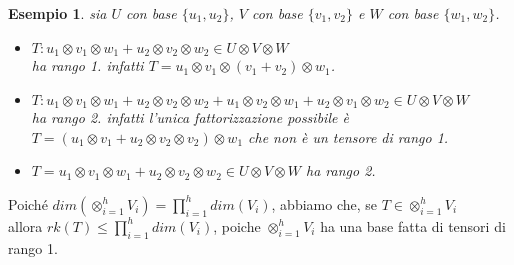 \documentclass[a4paper,12pt]{article}
\theoremstyle{def}
\theoremstyle{prop}
\theoremstyle{esempio}
\newtheorem*{example}{Esempio}
\theoremstyle{dimostrazione}
\theoremstyle{teo}
\theoremstyle{osservazione}
\begin{document}
\begin{example}
	sia \(U\) con base \(\{u_1, u_2\}\), \(V\) con base \(\{v_1, v_2\}\) e \(W\) con base \(\{w_1, w_2\}\).
	\begin{itemize}
		\item \(T: u_1 \otimes v_1 \otimes w_1 + u_2 \otimes v_2 \otimes w_2  \in U \otimes V  \otimes W\)\\
		      ha rango 1. infatti \(T = u_1 \otimes v_1 \otimes (v_1 + v_2 )\otimes w_1\).
		\item \(T: u_1 \otimes v_1 \otimes w_1 + u_2 \otimes v_2 \otimes w_2 + u_1 \otimes v_2 \otimes w_1 + u_2 \otimes v_1 \otimes w_2 \in U \otimes V \otimes W\)\\
		      ha rango 2. infatti l'unica fattorizzazione possibile è\\
		      \(T = (u_1 \otimes v_1  + u_2 \otimes v_2 \otimes v_2) \otimes w_1\) che non è un tensore di rango 1.
		\item \(T = u_1 \otimes v_1 \otimes w_1 + u_2 \otimes v_2 \otimes w_2 \in U \otimes V \otimes W \) ha rango 2.
	\end{itemize}
\end{example}

Poiché \(dim(\otimes_{i=1}^{h} V_i) = \prod_{i=1}^{h} dim(V_i)\), abbiamo che, se \(T \in \otimes_{i=1}^{h} V_i\)\\
allora \(rk(T) \leq \prod_{i=1}^{h} dim(V_i)\), poiche \(\otimes_{i=1}^{h} V_i\) ha una base fatta di tensori di rango 1.\\

\newpage
\end{document}
